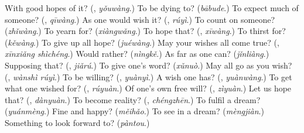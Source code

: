 \begin{tcolorbox}[breakable,colback=teal!4,colframe=teal!35!black,title={Before you move on}]
With good hopes of it? (\textbf{}, \emph{yǒuwàng}.) To be dying to? (\emph{bābude}.) To expect much of someone? (\textbf{}, \emph{qīwàng}.) As one would wish it? (\textbf{}, \emph{rúyì}.) To count on someone? (\emph{zhǐwàng}.) To yearn for? (\emph{xiàngwǎng}.) To hope that? (\textbf{}, \emph{xīwàng}.) To thirst for? (\emph{kěwàng}.) To give up all hope? (\emph{juéwàng}.) May your wishes all come true? (\textbf{}, \emph{xīnxiǎng shìchéng}.) Would rather? (\emph{nìngkě}.) As far as one can? (\emph{jǐnliàng}.) Supposing that? (\textbf{}, \emph{jiǎrú}.) To give one's word? (\emph{xǔnuò}.) May all go as you wish? (\textbf{}, \emph{wànshì rúyì}.) To be willing? (\textbf{}, \emph{yuànyì}.) A wish one has? (\textbf{}, \emph{yuànwàng}.) To get what one wished for? (\textbf{}, \emph{rúyuàn}.) Of one's own free will? (\textbf{}, \emph{zìyuàn}.) Let us hope that? (\textbf{}, \emph{dànyuàn}.) To become reality? (\textbf{}, \emph{chéngzhēn}.) To fulfil a dream? (\emph{yuánmèng}.) Fine and happy? (\emph{měihǎo}.) To see in a dream? (\emph{mèngjiàn}.) Something to look forward to? (\emph{pàntou}.)
\end{tcolorbox}
